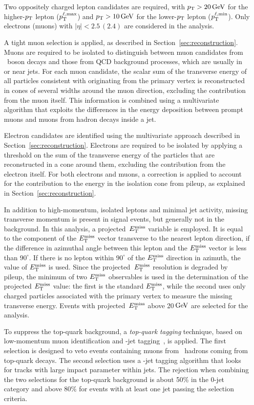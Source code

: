 \documentclass[12pt,twoside,a4paper,cmspaper,final,collab]{cms-tdr}
\begin{document}
Two oppositely charged lepton candidates are required, with $p_{\mathrm{T}} > 20\,\text{Ge\hspace{-.08em}V}$ for
the higher-$p_{\mathrm{T}}$ lepton ($p_{\mathrm{T}}^{\ell,\mathrm{max}}$) and $p_{\mathrm{T}} > 10\,\text{Ge\hspace{-.08em}V}$ for the lower-$p_{\mathrm{T}}$ lepton ($p_{\mathrm{T}}^{\ell,\mathrm{min}}$).
Only electrons (muons) with $|\eta| < 2.5 \, (2.4)$ are considered in the analysis.

A tight muon selection is applied,  as described in
Section~\ref{sec:reconstruction}. Muons are required to be isolated to
distinguish between muon candidates from \PW\ boson decays and those from QCD
background processes, which are usually in or near jets. For each muon
candidate, the scalar sum of the transverse energy of all particles
consistent with originating from the primary vertex is reconstructed in
cones of several widths around the muon direction, excluding the
contribution from the muon itself. This information is combined using a
multivariate algorithm that exploits the differences in the
energy deposition between prompt muons and muons from hadron decays inside
a jet.

Electron candidates are identified using the multivariate approach described in
Section~\ref{sec:reconstruction}. Electrons are required to be isolated by
applying a threshold on the sum of the transverse energy of the particles
that are reconstructed in a cone around them, excluding the contribution from
the electron itself.
For both electrons and muons, a correction is applied to account for the
contribution to the energy in the isolation cone from pileup, as
explained in Section~\ref{sec:reconstruction}.

In addition to high-momentum, isolated leptons and minimal jet activity, missing
transverse momentum is present in signal events, but generally not in the background.
In this analysis, a projected~$E_{\mathrm{T}}^{\text{miss}}$ variable is employed. It is
equal to the component of the $E_{\mathrm{T}}^{\text{miss}}$ vector transverse to the nearest lepton direction, if the
difference in azimuthal angle between this lepton and the $E_{\mathrm{T}}^{\text{miss}}$ vector is less
than $90^\circ$. If there is no lepton within  $90^\circ$ of the $E_{\mathrm{T}}^{\text{miss}}$ direction  in
azimuth, the value of $E_{\mathrm{T}}^{\text{miss}}$ is used.
Since the projected~$E_{\mathrm{T}}^{\text{miss}}$ resolution is degraded
by pileup, the minimum of two $E_{\mathrm{T}}^{\text{miss}}$ observables is used in the determination of the projected $E_{\mathrm{T}}^{\text{miss}}$ value:
the first is the standard
$E_{\mathrm{T}}^{\text{miss}}$, while the second uses only charged particles associated with the primary vertex to measure the missing transverse energy.
Events with projected~$E_{\mathrm{T}}^{\text{miss}}$ above 20$\,\text{Ge\hspace{-.08em}V}$ are selected for the analysis.

To suppress the top-quark background, a \textit{top-quark tagging} technique, based
on low-momentum muon identification and \cPqb-jet tagging~\cite{CMS-PAS-BTV-12-001}, is applied. The first
selection is designed to veto events containing muons from \cPqb\ hadrons coming from top-quark decays.
The second selection uses a \cPqb-jet tagging algorithm that looks for tracks with large impact parameter
within jets. The rejection when combining the two selections for the top-quark background is about 50\% in the 0-jet
category and above 80\% for events with at least one jet passing the selection criteria.
\end{document}
